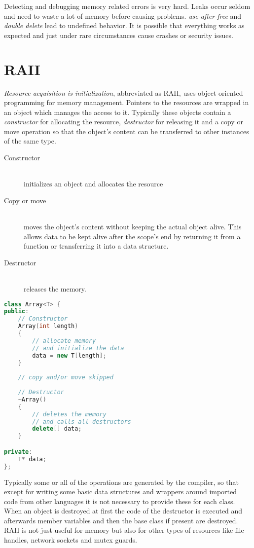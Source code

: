 \documentclass[conference,twocolumn]{IEEEtran}
\begin{document}
Detecting and debugging memory related errors is very hard. Leaks occur seldom and need to waste a lot of memory before causing problems. \emph{use-after-free} and \emph{double delete} lead to undefined behavior. It is possible that everything works as expected and just under rare circumstances cause crashes or security issues.


\section{RAII}
\emph{Resource acquisition is initialization}, abbreviated as RAII, uses object oriented programming for memory management. Pointers to the resources are wrapped in an object which manages the access to it. Typically these objects contain a \emph{constructor} for allocating the resource, \emph{destructor} for releasing it and a copy or move operation so that the object's content can be transferred to other instances of the same type.

\begin{description}
	\item[Constructor] \hfill \\ initializes an object and allocates the resource
	\item[Copy or move]  \hfill \\ moves the object's content without keeping the actual object alive. This allows data to be kept alive after the scope's end by returning it from a function or transferring it into a data structure.
	\item[Destructor]  \hfill \\ releases the memory.
\end{description}


\begin{lstlisting}[language=c++,frame=single]
class Array<T> {
public:
    // Constructor
    Array(int length)
    {
        // allocate memory
        // and initialize the data
        data = new T[length];
    }
    
    // copy and/or move skipped
    
    // Destructor
    ~Array()
    {
        // deletes the memory
        // and calls all destructors
        delete[] data;
    }

private:
    T* data;
};
\end{lstlisting}


Typically some or all of the operations are generated by the compiler, so that except for writing some basic data structures and wrappers around imported code from other languages it is not necessary to provide these for each class.
When an object is destroyed at first the code of the destructor is executed and afterwards member variables and then the base class if present are destroyed.
RAII is not just useful for memory but also for other types of resources like file handles, network sockets and mutex guards.
\end{document}
